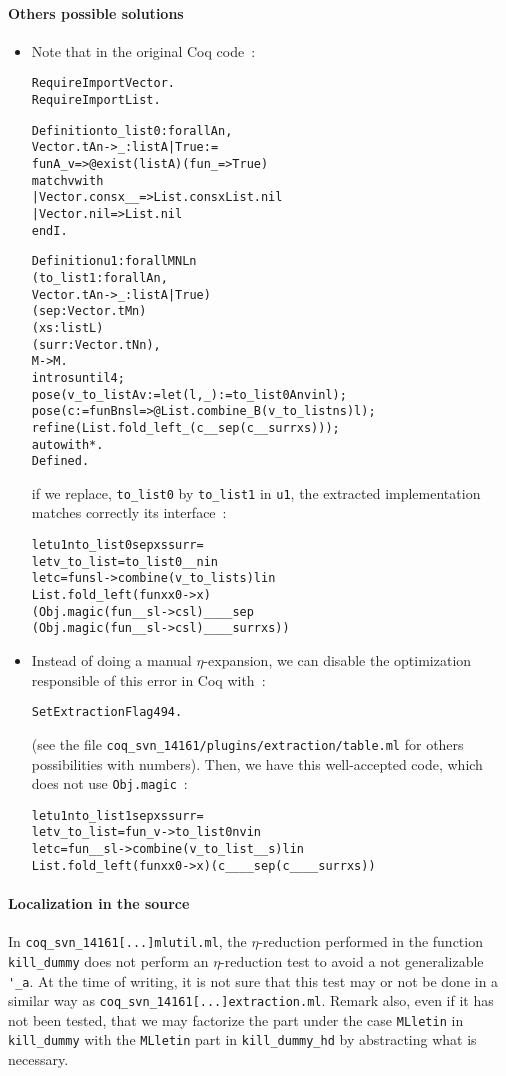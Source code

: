 \documentclass[a4paper, 11pt]{article}
\newenvironment{coq}
  {%
   \begin{alltt}
   \footnotesize} %% 8.3pl2 (April 2011)
  {\end{alltt} %
  }
\newenvironment{ml}
  {%
   \begin{alltt}
   \footnotesize} %% 3.12.0
  {\end{alltt} %
  }
\newcommand{\coqv}{14161}
\begin{document}
\paragraph{Others possible solutions}
\begin{itemize}
\item
Note that in the original Coq code~:
\begin{coq}
Require Import Vector.
Require Import List.

Definition to_list0 : forall A n,
  Vector.t A n -> { _ : list A | True } :=
  fun A _ v => @exist (list A) (fun _ => True) 
    match v with 
    | Vector.cons x _ _ => List.cons x List.nil
    | Vector.nil => List.nil
    end I.

Definition u1 : forall M N L n
  (to_list1 : forall A n,
  Vector.t A n -> { _ : list A | True })
  (sep : Vector.t M n)
  (xs : list L)
  (surr : Vector.t N n),
  M -> M.
  intros until 4;
  pose (v_to_list A v := let (l, _) := to_list0 A n v in l);
  pose (c := fun B n s l => @List.combine _ B (v_to_list n s) l);
  refine (List.fold_left _ (c _ _ sep (c _ _ surr xs)));
  auto with *.
Defined.
\end{coq}
if we replace, \verb|to_list0| by \verb|to_list1| in \verb|u1|, the extracted implementation matches correctly its interface~:
\begin{ml}
let u1 n to_list0 sep xs surr =
  let v_to_list = to_list0 __ n in
  let c = fun s l -> combine (v_to_list s) l in
  List.fold_left (fun x x0 -> x)
    (Obj.magic (fun _ _ s l -> c s l) __ __ sep
      (Obj.magic (fun _ _ s l -> c s l) __ __ surr xs))
\end{ml}

\item
Instead of doing a manual $\eta$-expansion, we can disable the optimization responsible of this error in Coq with~:
\begin{coq}
Set Extraction Flag 494.
\end{coq}
(see the file {\tt coq\_svn\_\coqv/plugins/extraction/table.ml} for others possibilities with numbers).
Then, we have this well-accepted code, which does not use \verb|Obj.magic|~:
\begin{ml}
let u1 n to_list1 sep xs surr =
  let v_to_list = fun _ v -> to_list0 n v in
  let c = fun _ _ s l -> combine (v_to_list __ s) l in
  List.fold_left (fun x x0 -> x) (c __ __ sep (c __ __ surr xs))
\end{ml}
\end{itemize}

\paragraph{Localization in the source}
In {\tt coq\_svn\_\coqv[...]mlutil.ml}, the $\eta$-reduction performed in the function \verb|kill_dummy| does not perform an $\eta$-reduction test to avoid a not generalizable \verb|'_a|. At the time of writing, it is not sure that this test may or not be done in a similar way as {\tt coq\_svn\_\coqv[...]extraction.ml}.
Remark also, even if it has not been tested, that we may factorize the part under the case \verb|MLletin| in \verb|kill_dummy| with the \verb|MLletin| part in \verb|kill_dummy_hd| by abstracting what is necessary.
\end{document}

